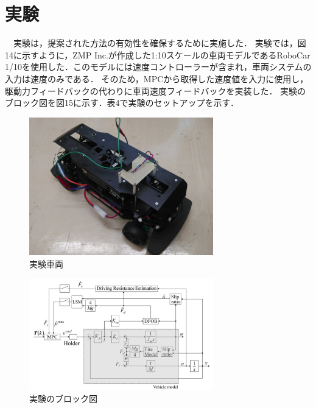 \chapter{実験}
　実験は，提案された方法の有効性を確保するために実施した． 実験では，図14に示すように，ZMP Inc.が作成した1:10スケールの車両モデルであるRoboCar 1/10を使用した．このモデルには速度コントローラーが含まれ，車両システムの入力は速度のみである． そのため，MPCから取得した速度値を入力に使用し，駆動力フィードバックの代わりに車両速度フィードバックを実装した． 実験のブロック図を図15に示す．表4で実験のセットアップを示す．
\begin{figure}[H]
    \centering
    \includegraphics[width=8cm]{./fig/fig14.png}
    \caption{実験車両}
\end{figure}
\begin{figure}[H]
    \centering
    \includegraphics[width=8cm]{./fig/fig15.png}
    \caption{実験のブロック図}
\end{figure}


